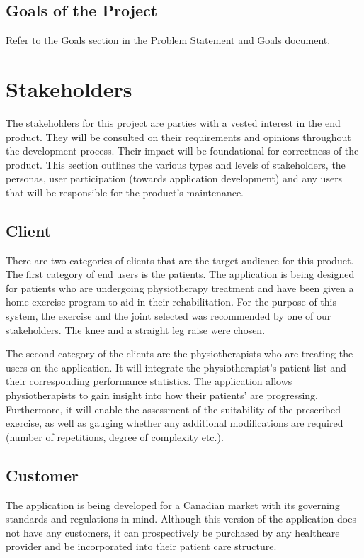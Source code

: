 \documentclass[12pt]{article}
\begin{document}
\subsection{Goals of the Project}
Refer to the Goals section in the \href{https://github.com/M9Huynh/technically-functional/blob/3f585acd522ef1d7568f902d0db7c4a2126dcfe7/docs/ProblemStatementAndGoals/ProblemStatement.pdf}{Problem Statement and Goals} document.

\section{Stakeholders}
The stakeholders for this project are parties with a vested interest in the end product. They will be consulted on their requirements and opinions throughout the development process. Their impact will be foundational for correctness of the product. This section outlines the various types and levels of stakeholders, the personas, user participation (towards application development) and any users that will be responsible for the product’s maintenance. 
\subsection{Client}
There are two categories of clients that are the target audience for this product. The first category of end users is the patients. The application is being designed for patients who are undergoing physiotherapy treatment and have been given a home exercise program to aid in their rehabilitation. For the purpose of this system, the exercise and the joint selected was recommended by one of our stakeholders. The knee and a straight leg raise were chosen.

The second category of the clients are the physiotherapists who are treating the users on the application. It will integrate the physiotherapist’s patient list and their corresponding performance statistics. The application allows physiotherapists to gain insight into how their patients’ are progressing. Furthermore, it will enable the assessment of the suitability of the prescribed exercise, as well as gauging whether any additional modifications are required (number of repetitions, degree of complexity etc.).

\subsection{Customer}
The application is being developed for a Canadian market with its governing standards and regulations in mind. Although this version of the application does not have any customers, it can prospectively be purchased by any healthcare provider and be incorporated into their patient care structure. 
\end{document}
